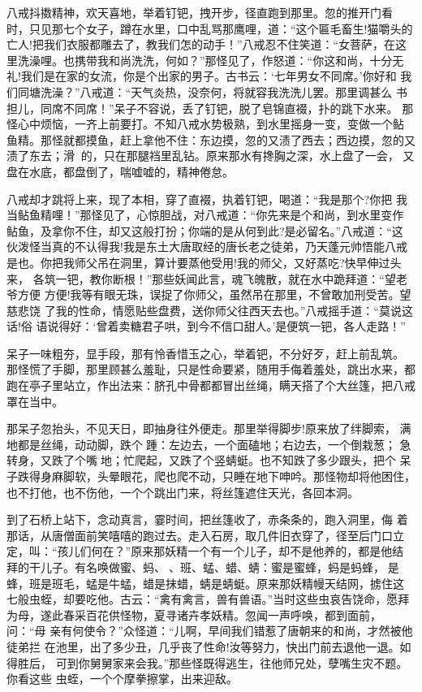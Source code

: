 八戒抖擞精神，欢天喜地，举着钉钯，拽开步，径直跑到那里。忽的推开门看
时，只见那七个女子，蹲在水里，口中乱骂那鹰哩，道：“这个匾毛畜生!猫嚼头的
亡人!把我们衣服都雕去了，教我们怎的动手！”八戒忍不住笑道：“女菩萨，在这
里洗澡哩。也携带我和尚洗洗，何如？”那怪见了，作怒道：“你这和尚，十分无
礼!我们是在家的女流，你是个出家的男子。古书云：‘七年男女不同席。’你好和
我们同塘洗澡？”八戒道：“天气炎热，没奈何，将就容我洗洗儿罢。那里调甚么
书担儿，同席不同席！”呆子不容说，丢了钉钯，脱了皂锦直裰，扑的跳下水来。
那怪心中烦恼，一齐上前要打。不知八戒水势极熟，到水里摇身一变，变做一个鲇
鱼精。那怪就都摸鱼，赶上拿他不住：东边摸，忽的又渍了西去；西边摸，忽的又
渍了东去；滑的，只在那腿裆里乱钻。原来那水有搀胸之深，水上盘了一会，
又盘在水底，都盘倒了，喘嘘嘘的，精神倦怠。

八戒却才跳将上来，现了本相，穿了直裰，执着钉钯，喝道：“我是那个?你把
我当鲇鱼精哩！”那怪见了，心惊胆战，对八戒道：“你先来是个和尚，到水里变作
鲇鱼，及拿你不住，却又这般打扮；你端的是从何到此?是必留名。”八戒道：“这
伙泼怪当真的不认得我!我是东土大唐取经的唐长老之徒弟，乃天蓬元帅悟能八戒
是也。你把我师父吊在洞里，算计要蒸他受用!我的师父，又好蒸吃?快早伸过头来，
各筑一钯，教你断根！”那些妖闻此言，魂飞魄散，就在水中跪拜道：“望老爷方便
方便!我等有眼无珠，误捉了你师父，虽然吊在那里，不曾敢加刑受苦。望慈悲饶
了我的性命，情愿贴些盘费，送你师父往西天去也。”八戒摇手道：“莫说这话!俗
语说得好：‘曾着卖糖君子哄，到今不信口甜人。’是便筑一钯，各人走路！”

呆子一味粗夯，显手段，那有怜香惜玉之心，举着钯，不分好歹，赶上前乱筑。
那怪慌了手脚，那里顾甚么羞耻，只是性命要紧，随用手侮着羞处，跳出水来，都
跑在亭子里站立，作出法来：脐孔中骨都都冒出丝绳，瞒天搭了个大丝篷，把八戒
罩在当中。

那呆子忽抬头，不见天日，即抽身往外便走。那里举得脚步!原来放了绊脚索，
满地都是丝绳，动动脚，跌个踵：左边去，一个面磕地；右边去，一个倒栽葱；
急转身，又跌了个嘴地；忙爬起，又跌了个竖蜻蜓。也不知跌了多少跟头，把个
呆子跌得身麻脚软，头晕眼花，爬也爬不动，只睡在地下呻吟。那怪物却将他困住，
也不打他，也不伤他，一个个跳出门来，将丝篷遮住天光，各回本洞。

到了石桥上站下，念动真言，霎时间，把丝篷收了，赤条条的，跑入洞里，侮
着那话，从唐僧面前笑嘻嘻的跑过去。走入石房，取几件旧衣穿了，径至后门口立
定，叫：“孩儿们何在？”原来那妖精一个有一个儿子，却不是他养的，都是他结
拜的干儿子。有名唤做蜜、蚂、、班、蜢、蜡、蜻：蜜是蜜蜂，蚂是蚂蜂，是
蜂，班是班毛，蜢是牛蜢，蜡是抹蜡，蜻是蜻蜓。原来那妖精幔天结网，掳住这
七般虫蛭，却要吃他。古云：“禽有禽言，兽有兽语。”当时这些虫哀告饶命，愿拜
为母，遂此春采百花供怪物，夏寻诸卉孝妖精。忽闻一声呼唤，都到面前，问：“母
亲有何使令？”众怪道：“儿啊，早间我们错惹了唐朝来的和尚，才然被他徒弟拦
在池里，出了多少丑，几乎丧了性命!汝等努力，快出门前去退他一退。如得胜后，
可到你舅舅家来会我。”那些怪既得逃生，往他师兄处，孽嘴生灾不题。你看这些
虫蛭，一个个摩拳擦掌，出来迎敌。

